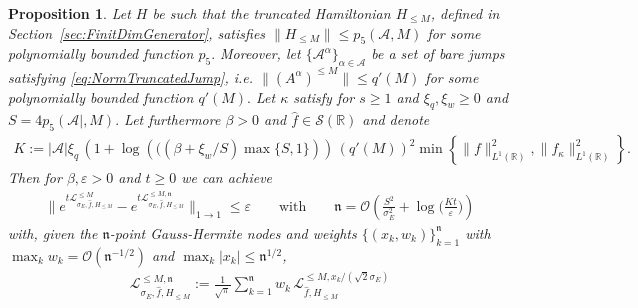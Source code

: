 \documentclass[11pt]{amsart}
\newcommand{\1}{\mathbbm{1}}
\newcommand{\R}{\mathbb{R}}
\newcommand{\eps}{\varepsilon}
\renewcommand{\epsilon}{\varepsilon}
\newcommand{\cA}{\mathcal{A}}
\theoremstyle{plain}
\newtheorem{proposition}[theorem]{Proposition}
\theoremstyle{definition}
\theoremstyle{remark}
\numberwithin{equation}{section}
\begin{document}
\begin{proposition}
\label{prop:DiscreteGauss}
 Let $H$ be such that the truncated Hamiltonian $H_{\le M}$, defined in Section~\ref{sec:FinitDimGenerator}, satisfies $\|H_{\le M}\| \le  p_5(\cA,M)$ for some polynomially bounded function $p_5.$ Moreover, let $\{\cA^\alpha\}_{\alpha\in\cA}$ be a set of bare jumps satisfying \eqref{eq:NormTruncatedJump}, i.e. $\|\left(A^\alpha\right)^{\le M}\|\le q'(M)$ for some polynomially bounded function $q'(M).$ Let $\kappa$ satisfy   for $s\ge 1$ and $\xi_q,\xi_w\ge 0$ and  
 $S=4p_5(\cA|,M).$ 
 Let furthermore $\beta>0$ and $\widehat f\in\mathcal{S}(\R)$ and denote 
\begin{align*}
    K:=|\mathcal{A}|\xi_q\,(1+\log\left(((\beta+\xi_w/S)\max\{S,1\}\right))   \,\left(q'(M)\right)^2 \min\left\{\|f\|^2_{L^1(\R)},\|f_\kappa\|^2_{L^1(\R)}\right\}.
\end{align*} 
Then for $\beta,\eps>0$ and $t\ge 0$ we can achieve
\begin{align}
\label{eq:DiscreteGaussEvolution}
 \Big\|e^{t\mathcal{L}^{\le M}_{\sigma_E,\widehat{f},H_{\le M}}}-e^{t\mathcal{L}^{\le M,\mathfrak{n}}_{\sigma_E,\widehat{f},H_{\le M}}}\Big\|_{1\to 1}\le \epsilon \qquad \text{with}\qquad \mathfrak{n}=\mathcal{O}\left(  \frac{S^2}{\sigma_E^2}+\log\Big(\frac{K t}{\epsilon}\Big)\right)
\end{align}
with, given the $\mathfrak{n}$-point Gauss-Hermite nodes and weights $\{(x_k,w_k)\}_{k=1}^{\mathfrak{n}}$ with $\max_{k}w_k=\mathcal{O}(\mathfrak{n}^{-1/2})$ and $\max_k|x_k|\le \mathfrak{n}^{1/2}$, 
\begin{align}
\label{eq:ImplementedGenerator}
\mathcal{L}^{\le M,\mathfrak{n}}_{\sigma_E,\widehat{f},H_{\le M}}:=\frac{1}{\sqrt{\pi}}
\sum_{k=1}^{\mathfrak{n}}
w_k\,\mathcal{L}_{\widehat{f},H_{\le M}}^{\le M,x_k/(\sqrt{2}\sigma_E)}
\end{align}
\end{proposition}
\end{document}
